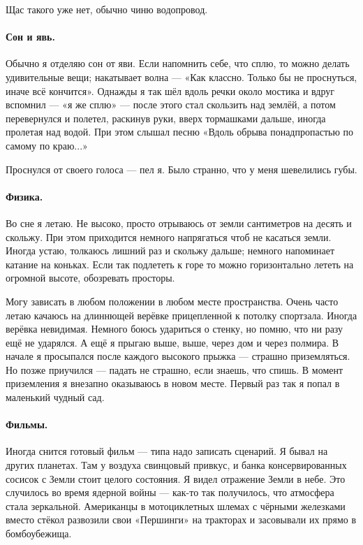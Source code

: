 \documentclass{book}
\begin{document}
Щас такого уже нет, обычно чиню водопровод.

\paragraph{Сон и явь.}
Обычно я отделяю сон от яви.
Если напомнить себе, что сплю, то можно делать удивительные вещи;
накатывает волна --- «Как классно. Только бы не проснуться, иначе всё кончится».
Однажды я так шёл вдоль речки около мостика и вдруг вспомнил --- «я же сплю» --- после этого стал скользить над землёй, а потом перевернулся и полетел, раскинув руки, вверх тормашками дальше, иногда пролетая над водой.
При этом слышал песню «Вдоль обрыва понадпропастью по самому по краю...»

Проснулся от своего голоса --- пел я.
Было странно, что у меня шевелились губы.

\paragraph{Физика.}
Во сне я летаю.
Не высоко, просто отрываюсь от земли сантиметров на десять и скольжу.
При этом приходится немного напрягаться чтоб не касаться земли.
Иногда устаю, толкаюсь лишний раз и скольжу дальше; немного напоминает катание на коньках.
Если так подлететь к горе то можно горизонтально лететь на огромной высоте,
обозревать просторы.

Могу зависать в любом положении в любом месте пространства.
Очень часто летаю качаюсь на длиннющей верёвке прицепленной к потолку спортзала.
Иногда верёвка невидимая.
Немного боюсь удариться о стенку, но помню, что ни разу ещё не ударялся.
А ещё я прыгаю выше, выше, через дом и через полмира.
В начале я просыпался после каждого высокого прыжка --- страшно приземляться.
Но позже приучился --- падать не страшно, если знаешь, что спишь.
В момент приземления я внезапно оказываюсь в новом месте.
Первый раз так я попал в маленький чудный сад.

\paragraph{Фильмы.}
Иногда снится готовый фильм --- типа надо записать сценарий.
Я бывал на других планетах.
Там у воздуха свинцовый привкус, и банка консервированных сосисок с Земли стоит целого состояния.
Я видел отражение Земли в небе.
Это случилось во время ядерной войны --- как-то так получилось, что атмосфера стала зеркальной.
Американцы в мотоциклетных шлемах с чёрными железками вместо стёкол развозили свои «Першинги» на тракторах и засовывали их прямо в бомбоубежища.
\end{document}
